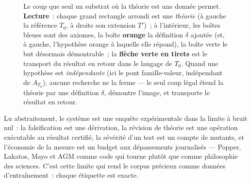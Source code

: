 \documentclass[11pt]{article}
\theoremstyle{remark}\newtheorem{example}{Exemple}
\begin{document}
\begin{figure}[t]\centering
{}
\caption{Le coup que seul un substrat où la théorie est une donnée permet.
\textbf{Lecture}~: chaque grand rectangle arrondi est une \emph{théorie} (à gauche la
référence $T_0$, à droite son extension $T'$)~; à l'intérieur, les boîtes bleues sont
des axiomes, la boîte \textbf{orange} la définition $\delta$ ajoutée (et, à gauche,
l'hypothèse orange à laquelle elle répond), la boîte verte le but désormais
démontrable~; la \textbf{flèche verte en tirets} est le transport du résultat en
retour dans le langage de $T_0$. Quand une
hypothèse est \emph{indépendante} (ici le pont famille-valeur, indépendant de
$A_{T_0}$), aucune recherche ne la ferme --- le seul coup légal étend la théorie par
une définition $\delta$, démontre l'image, et transporte le résultat en retour.}
\label{fig:extension}
\end{figure}

Lu abstraitement, le système est une enquête expérimentale dans la limite à bruit
nul~: la falsification est une dérivation, la révision de théorie est une opération
exécutable au résultat certifié, la sévérité d'un test est un compte de mutants, et
l'économie de la mesure est un budget aux dépassements journalisés --- Popper, Lakatos,
Mayo et AGM comme code qui tourne plutôt que comme philosophie des sciences. C'est
cette limite qui rend le corpus précieux comme données d'entraînement~: chaque
étiquette est exacte.
\end{document}
